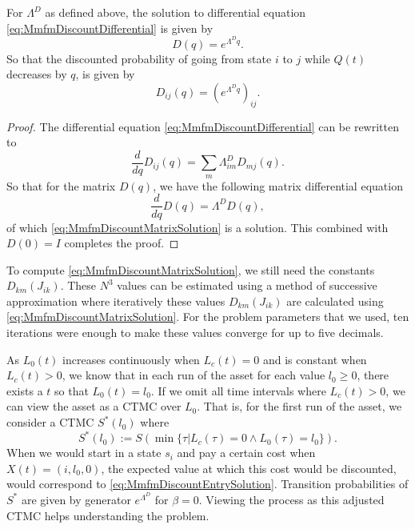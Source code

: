 \begin{theorem}
	For $\Lambda^D$ as defined above, the solution to differential equation \eqref{eq:MmfmDiscountDifferential} is given by
	\begin{equation}\label{eq:MmfmDiscountMatrixSolution}
	D(q)=e^{\Lambda^D q}.
	\end{equation}
	So that the discounted probability of going from state $i$ to $j$ while $Q(t)$ decreases by $q$, is given by
	\begin{equation}\label{eq:MmfmDiscountEntrySolution}
	D_{ij}(q)=\left(e^{\Lambda^D q}\right)_{ij}.
	\end{equation}
	\begin{proof}
		The differential equation \eqref{eq:MmfmDiscountDifferential} can be rewritten to
		\[
			\frac{d}{dq}D_{ij}(q)=\sum\limits_m\Lambda^D_{im}D_{mj}(q).
		\]
		So that for the matrix $D(q)$, we have the following matrix differential equation
		\[
		\frac{d}{dq}D(q)=\Lambda^D D(q),
		\]
		of which \eqref{eq:MmfmDiscountMatrixSolution} is a solution.
		This combined with $D(0)=I$ completes the proof.
	\end{proof}
\end{theorem}

\begin{remark}
	To compute \eqref{eq:MmfmDiscountMatrixSolution}, we still need the constants $D_{km}(J_{ik})$.
	These $N^3$ values can be estimated using a method of successive approximation where iteratively these values $D_{km}(J_{ik})$ are calculated using \eqref{eq:MmfmDiscountMatrixSolution}.
	For the problem parameters that we used, ten iterations were enough to make these values converge for up to five decimals.
\end{remark}

\begin{remark}\label{remark:MmfmStochasticShortestPath}
	As $L_0(t)$ increases continuously when $L_c(t)=0$ and is constant when $L_c(t)>0$, we know that in each run of the asset for each value $l_0\geq0$, there exists a $t$ so that $L_0(t)=l_0$.
	If we omit all time intervals where $L_c(t)>0$, we can view the asset as a CTMC over $L_0$.
	That is, for the first run of the asset, we consider a CTMC $S^*(l_0)$ where
	\[
	S^*(l_0):=S(\min\{\tau|L_c(\tau)=0\wedge L_0(\tau)=l_0\}).
	\]
	When we would start in a state $s_i$ and pay a certain cost when $X(t)=(i,l_0,0)$, the expected value at which this cost would be discounted, would correspond to \eqref{eq:MmfmDiscountEntrySolution}.
	Transition probabilities of $S^*$ are given by generator $e^{\Lambda^D}$ for $\beta=0$.
	Viewing the process as this adjusted CTMC helps understanding the problem.
\end{remark}

